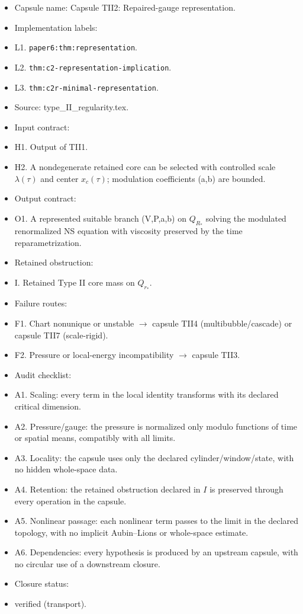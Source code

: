 \documentclass[11pt]{amsart}
\begin{document}
\begin{itemize}
  \item Capsule name: Capsule TII2: Repaired-gauge representation.
  \item Implementation labels:
  \item L1. \texttt{paper6:thm:representation}.
  \item L2. \texttt{thm:c2-representation-implication}.
  \item L3. \texttt{thm:c2r-minimal-representation}.
  \item Source: type\_II\_regularity.tex.
  \item Input contract:
  \item H1. Output of TII1.
  \item H2. A nondegenerate retained core can be selected with controlled scale $\lambda(\tau)$ and center $x_c(\tau)$; modulation coefficients (a,b) are bounded.
  \item Output contract:
  \item O1. A represented suitable branch (V,P,a,b) on $Q_{R_*}$ solving the modulated renormalized NS equation with viscosity preserved by the time reparametrization.
  \item Retained obstruction:
  \item I. Retained Type II core mass on $Q_{r_*}$.
  \item Failure routes:
  \item F1. Chart nonunique or unstable $\to$ capsule TII4 (multibubble/cascade) or capsule TII7 (scale-rigid).
  \item F2. Pressure or local-energy incompatibility $\to$ capsule TII3.
  \item Audit checklist:
  \item A1. Scaling: every term in the local identity transforms with its declared critical dimension.
  \item A2. Pressure/gauge: the pressure is normalized only modulo functions of time or spatial means, compatibly with all limits.
  \item A3. Locality: the capsule uses only the declared cylinder/window/state, with no hidden whole-space data.
  \item A4. Retention: the retained obstruction declared in $I$ is preserved through every operation in the capsule.
  \item A5. Nonlinear passage: each nonlinear term passes to the limit in the declared topology, with no implicit Aubin--Lions or whole-space estimate.
  \item A6. Dependencies: every hypothesis is produced by an upstream capsule, with no circular use of a downstream closure.
  \item Closure status:
  \item verified (transport).
\end{itemize}
\end{document}
